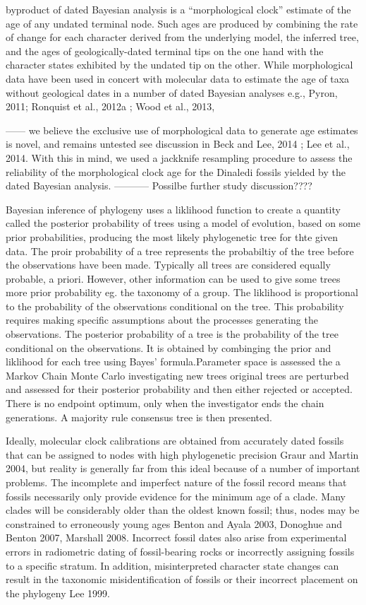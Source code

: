 \documentclass[11pt,letterpaper]{article}
\begin{document}
byproduct of dated Bayesian analysis is a “morphological clock” estimate of the age of any undated terminal node. Such ages are produced by combining the rate of change for each character derived from the underlying model, the inferred tree, and the ages of geologically-dated terminal tips on the one hand with the character states exhibited by the undated tip on the other. While morphological data have been used in concert with molecular data to estimate the age of taxa without geological dates in a number of dated Bayesian analyses e.g., Pyron, 2011; Ronquist et al., 2012a ;  Wood et al., 2013, 

------ we believe the exclusive use of morphological data to generate age estimates is novel, and remains untested see discussion in Beck and Lee, 2014 ;  Lee et al., 2014. With this in mind, we used a jackknife resampling procedure to assess the reliability of the morphological clock age for the Dinaledi fossils yielded by the dated Bayesian analysis. ----------- Possilbe further study discussion????

Bayesian inference of phylogeny uses a liklihood function to create a quantity called the posterior probability of trees using a model of evolution, based on some prior probabilities, producing the most likely phylogenetic tree for thte given data. The proir probability of a tree represents the probabiltiy of the tree before the observations have been made. Typically all trees are considered equally probable, a priori. However, other information can be used to give some trees more prior probability eg. the taxonomy of a group. The liklihood is proportional to the probability of the observations conditional on the tree. This probability requires making specific assumptions about the processes generating the observations. The posterior probability of a tree is the probability of the tree conditional on the observations. It is obtained by combinging the prior and liklihood for each tree using Bayes' formula.Parameter space is assessed the a Markov Chain Monte Carlo investigating new trees original trees are perturbed and assessed for their posterior probability and then either rejected or accepted. There is no endpoint optimum, only when the investigator ends the chain generations. A majority rule consensus tree is then presented.

Ideally, molecular clock calibrations are obtained from accurately dated fossils that can be assigned to nodes with high phylogenetic precision Graur and Martin 2004, but reality is generally far from this ideal because of a number of important problems. The incomplete and imperfect nature of the fossil record means that fossils necessarily only provide evidence for the minimum age of a clade. Many clades will be considerably older than the oldest known fossil; thus, nodes may be constrained to erroneously young ages Benton and Ayala 2003, Donoghue and Benton 2007, Marshall 2008. Incorrect fossil dates also arise from experimental errors in radiometric dating of fossil-bearing rocks or incorrectly assigning fossils to a specific stratum. In addition, misinterpreted character state changes can result in the taxonomic misidentification of fossils or their incorrect placement on the phylogeny Lee 1999. 
\end{document}
